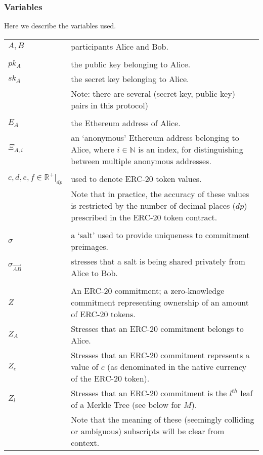 \subsubsection{Variables}
\label{sec:20Variables}
Here we describe the variables used.

\begin{center}
	\begin{tabular}{lp{14cm}}
    $A, B$        & participants Alice and Bob.\\
    \\
    $pk_A$        & the public key belonging to Alice.\\
    $sk_A$        & the secret key belonging to Alice.\\
                  & Note: there are several (secret key, public key) pairs in this protocol)\\
    \\
    $E_A$         & the Ethereum address of Alice.\\
    $\Xi_{A,i}$   & an `anonymous' Ethereum address belonging to Alice, where $i\in\mathbb{N}$ is an index, for distinguishing between multiple anonymous addresses.\\
    \\
    $c, d, e, f \in \mathbb{R}^+\rvert_{dp}$ & used to denote ERC-20 token values.\\
                  & Note that in practice, the accuracy of these values is restricted by the number of decimal places ($dp$) prescribed in the ERC-20 token contract.\\
    \\
    $\sigma$      & a `salt' used to provide uniqueness to commitment preimages.\\
    $\sigma_{\vec{AB}}$ & stresses that a salt is being shared privately from Alice to Bob.\\
    \\
    $Z$           & An ERC-20 commitment; a zero-knowledge commitment representing ownership of an amount of ERC-20 tokens. \\
    $Z_A$         & Stresses that an ERC-20 commitment belongs to Alice.\\
    $Z_c$         & Stresses that an ERC-20 commitment represents a value of $c$ (as denominated in the native currency of the ERC-20 token).\\
    $Z_{l}$       & Stresses that an ERC-20 commitment is the $l^{th}$ leaf of a Merkle Tree (see below for $M$).\\
                  & Note that the meaning of these (seemingly colliding or ambiguous) subscripts will be clear from context.\\

\end{tabular}
\end{center}
